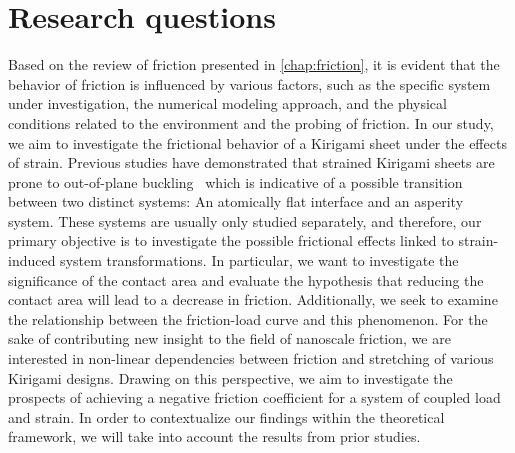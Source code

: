 



\section{Research questions}\label{sec:research_questions}
Based on the review of friction presented in \cref{chap:friction}, it is evident that the behavior of friction is influenced by various factors, such as the specific system under investigation, the numerical modeling approach, and the physical conditions related to the environment and the probing of friction. In our study, we aim to investigate the frictional behavior
of a Kirigami sheet under the effects of strain. Previous studies have
demonstrated that strained Kirigami sheets are prone to out-of-plane buckling~\cite{PhysRevLett.121.255304, PhysRevResearch.2.042006} which is indicative of a possible transition between two distinct systems: An atomically flat interface and an asperity system. These systems are usually only studied
separately, and therefore, our primary objective is to investigate the possible frictional effects linked to strain-induced system transformations. In particular, we want to investigate the significance of the contact area and evaluate the hypothesis that reducing the contact area will lead to a decrease in friction. Additionally, we seek to examine the relationship between the friction-load curve and this phenomenon. For the sake of contributing new insight to the field of nanoscale
friction, we are interested in non-linear dependencies between
friction and stretching of various Kirigami designs. Drawing on this
perspective, we aim to investigate the prospects of achieving a negative friction coefficient for a system of coupled load and strain. In order to contextualize our findings within the theoretical framework, we will take into account the results from prior studies.



